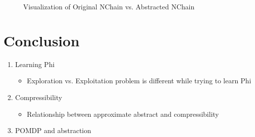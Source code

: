 \documentclass{article}
\begin{document}
\begin{figure}[h]
\centering
{}
\hspace{3mm}
\caption{Visualization of Original NChain vs. Abstracted NChain}
\end{figure}






\section{Conclusion}


\begin{enumerate}
\item Learning Phi
\begin{itemize}
\item Exploration vs. Exploitation problem is different while trying to learn Phi
\end{itemize}
\item Compressibility
\begin{itemize}
\item Relationship between approximate abstract and compressibility
\end{itemize}
\item POMDP and abstraction
\end{enumerate}







\end{document}
